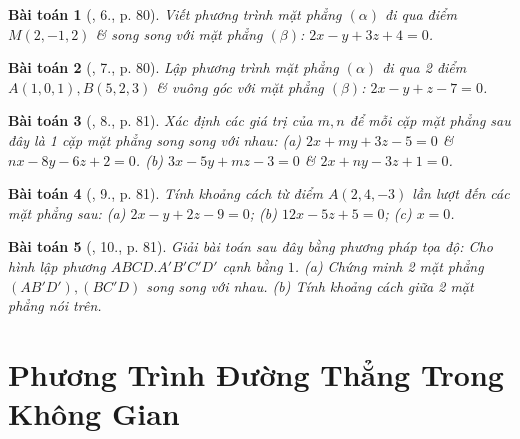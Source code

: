 \documentclass{article}
\newtheorem{baitoan}{Bài toán}
\begin{document}
\begin{baitoan}[\cite{SGK_Toan_12_hinh_hoc_co_ban}, 6., p. 80]
	Viết phương trình mặt phẳng $(\alpha)$ đi qua điểm $M(2,-1,2)$ \& song song với mặt phẳng $(\beta)$: $2x - y + 3z + 4 = 0$.
\end{baitoan}

\begin{baitoan}[\cite{SGK_Toan_12_hinh_hoc_co_ban}, 7., p. 80]
	Lập phương trình mặt phẳng $(\alpha)$ đi qua 2 điểm $A(1,0,1),B(5,2,3)$ \& vuông góc với mặt phẳng $(\beta)$: $2x - y + z - 7 = 0$.
\end{baitoan}

\begin{baitoan}[\cite{SGK_Toan_12_hinh_hoc_co_ban}, 8., p. 81]
	Xác định các giá trị của $m,n$ để mỗi cặp mặt phẳng sau đây là 1 cặp mặt phẳng song song với nhau: (a) $2x + my + 3z - 5 = 0$ \& $nx - 8y - 6z + 2 = 0$. (b) $3x - 5y + mz - 3 = 0$ \& $2x + ny - 3z + 1 = 0$.
\end{baitoan}

\begin{baitoan}[\cite{SGK_Toan_12_hinh_hoc_co_ban}, 9., p. 81]
	Tính khoảng cách từ điểm $A(2,4,-3)$ lần lượt đến các mặt phẳng sau: (a) $2x - y + 2z - 9 = 0$; (b) $12x - 5z + 5 = 0$; (c) $x = 0$.
\end{baitoan}

\begin{baitoan}[\cite{SGK_Toan_12_hinh_hoc_co_ban}, 10., p. 81]
	Giải bài toán sau đây bằng phương pháp tọa độ: Cho hình lập phương $ABCD.A'B'C'D'$ cạnh bằng $1$. (a) Chứng minh 2 mặt phẳng $(AB'D'),(BC'D)$ song song với nhau. (b) Tính khoảng cách giữa 2 mặt phẳng nói trên.
\end{baitoan}


\section{Phương Trình Đường Thẳng Trong Không Gian}


\printbibliography[heading=bibintoc]
	
\end{document}
